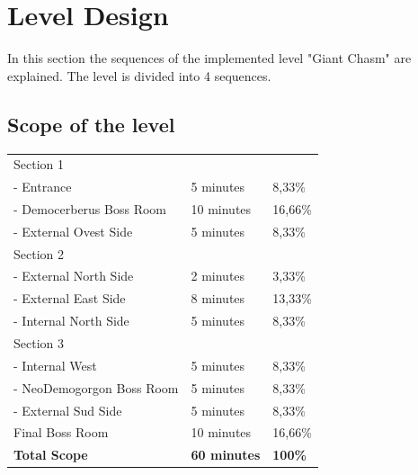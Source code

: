 \section{Level Design}
In this section the sequences of the implemented level "Giant Chasm" are explained. The level is divided into 4 sequences.

\subsection{Scope of the level}

\vspace*{0.5cm}

\begin{center}
	\begin{tabular}[c]{| p{6cm} | p{4cm} | p{3cm} |}
		\hline
		Section 1 &                & \\
		 - Entrance                   & 5 minutes                  & 8,33\%                 \\
		 - Democerberus Boss Room          & 10 minutes                  & 16,66\%                 \\
		 - External Ovest Side           & 5 minutes			                & 8,33\%	                  \\ \hline
		 Section 2 &                & \\
		 - External North Side                   & 2 minutes                  & 3,33\%                 \\
		 - External East Side          & 8 minutes                  & 13,33\%                 \\
		 - Internal North Side           & 5 minutes		                & 8,33\%                  \\ \hline
		 Section 3 &                & \\
		 - Internal West                   & 5 minutes                  & 8,33\%                 \\
		 - NeoDemogorgon Boss Room          & 5 minutes                  & 8,33\%                 \\
		 - External Sud Side           & 5 minutes			                & 8,33\%	                  \\ \hline
		 Final Boss Room           & 10	minutes		                & 16,66\%	                  \\ \hline
		 \textbf{Total Scope}              & \textbf{60 minutes} & \textbf{100\%}      \\ \hline
	\end{tabular}
\end{center}

